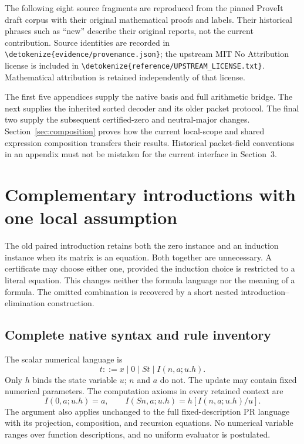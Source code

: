 \documentclass[11pt,letterpaper]{article}
\theoremstyle{definition}\newtheorem{definition}[theorem]{Definition}
\theoremstyle{remark}\newtheorem{remark}[theorem]{Remark}
\newcommand{\file}[1]{\expandafter\nolinkurl\expandafter{\detokenize{#1}}}
\begin{document}
The following eight source fragments are reproduced from the pinned ProveIt
draft corpus with their original mathematical proofs and labels. Their
historical phrases such as ``new'' describe their original reports, not the
current contribution. Source identities are recorded in
\file{evidence/provenance.json}; the upstream MIT No Attribution license is
included in \file{reference/UPSTREAM_LICENSE.txt}. Mathematical attribution is
retained independently of that license.

The first five appendices supply the native basis and full arithmetic bridge.
The next supplies the inherited sorted decoder and its older packet protocol.
The final two supply the subsequent certified-zero and neutral-major changes.
Section~\ref{sec:composition} proves how the current local-scope and shared
expression composition transfers their results. Historical packet-field
conventions in an appendix must not be mistaken for the current interface in
Section~3.


\section{Complementary introductions with one local assumption}
\label{sec:choice-introduction}

The old paired introduction retains both the zero instance and an
induction instance when its matrix is an equation. Both together are
unnecessary. A certificate may choose either one, provided the induction
choice is restricted to a literal equation. This changes neither the
formula language nor the meaning of a formula. The omitted combination
is recovered by a short nested introduction--elimination construction.

\subsection{Complete native syntax and rule inventory}

The scalar numerical language is
\[
 t::=x\mid0\mid St\mid I(n,a;u.h).
\]
Only $h$ binds the state variable $u$; $n$ and $a$ do not.
The update may contain fixed numerical parameters. The computation
axioms in every retained context are
\[
 I(0,a;u.h)=a,\qquad
 I(Sn,a;u.h)=h[I(n,a;u.h)/u].
 \tag{I0, IS}\label{eq:choice-computations}
\]
The argument also applies unchanged to the full fixed-description PR
language with its projection, composition, and recursion equations.
No numerical variable ranges over function descriptions, and no uniform
evaluator is postulated.
\end{document}
